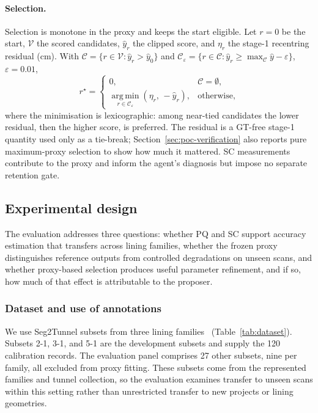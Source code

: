 \documentclass[a4paper,fleqn]{cas-dc}
\begin{document}
\paragraph{Selection.}
Selection is monotone in the proxy and keeps the start eligible. Let $r=0$ be the start, $\mathcal V$ the scored candidates, $\hat y_r$ the clipped score, and $\eta_r$ the stage-1 recentring residual (cm). With $\mathcal C=\{r\in\mathcal V:\hat y_r>\hat y_0\}$ and $\mathcal C_\varepsilon=\{r\in\mathcal C:\hat y_r\ge\max_{\mathcal C}\hat y-\varepsilon\}$, $\varepsilon=0.01$,
\begin{equation}
r^\star=
\begin{cases}
0, & \mathcal C=\emptyset,\\
\operatorname*{arg\,min}_{r\in\mathcal C_\varepsilon}(\eta_r,\,-\hat y_r), & \text{otherwise},
\end{cases}
\label{eq:refinement-selection}
\end{equation}
where the minimisation is lexicographic: among near-tied candidates the lower residual, then the higher score, is preferred. The residual is a GT-free stage-1 quantity used only as a tie-break; Section~\ref{sec:poc-verification} also reports pure maximum-proxy selection to show how much it mattered. SC measurements contribute to the proxy and inform the agent's diagnosis but impose no separate retention gate.

\subsection{Experimental design}
\label{sec:exp-setup}

The evaluation addresses three questions: whether PQ and SC support accuracy estimation that transfers across lining families, whether the frozen proxy distinguishes reference outputs from controlled degradations on unseen scans, and whether proxy-based selection produces useful parameter refinement, and if so, how much of that effect is attributable to the proposer.

\subsubsection{Dataset and use of annotations}
\label{sec:dataset}

We use Seg2Tunnel subsets from three lining families~\cite{lin2024seg2tunnel} (Table~\ref{tab:dataset}). Subsets 2-1, 3-1, and 5-1 are the development subsets and supply the 120 calibration records. The evaluation panel comprises 27 other subsets, nine per family, all excluded from proxy fitting. These subsets come from the represented families and tunnel collection, so the evaluation examines transfer to unseen scans within this setting rather than unrestricted transfer to new projects or lining geometries.
\end{document}
